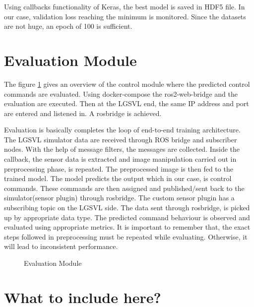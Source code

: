 Using callbacks functionality of Keras, the best model is saved in HDF5 file. In our case, validation
loss  reaching the minimum is monitored. Since the datasets are not huge, an epoch of 100
is sufficient.
\fi
\section{Evaluation Module}
The figure \ref{fig:evaluationfigure} gives an overview of the control module where the
predicted control commands are evaluated.
Using docker-compose the ros2-web-bridge and the evaluation are executed. Then at the
LGSVL end, the same IP address and port are entered and listened in. A rosbridge is
achieved.

Evaluation is basically completes the loop of end-to-end training architecture.  The LGSVL simulator data are received through ROS
bridge and subscriber nodes. With the help of message filters, the messages are collected.
Inside the callback, the sensor data is extracted and image manipulation carried out in preprocessing phase, is
repeated. The preprocessed image is then fed to the trained model. The model predicts the
output which in our case, is control commands. These commands are then assigned and published/sent
back to the simulator(sensor plugin) through rosbridge. The custom sensor plugin has a subscribing topic on the
LGSVL side. The data sent through rosbridge, is picked up by appropriate data type. The predicted command behaviour is observed and
evaluated using appropriate metrics. It is important to remember that, the exact steps followed
in preprocessing must be repeated while evaluating. Otherwise, it will lead to inconsistent
performance.

\begin{figure}
	\centering
    \def\svgwidth{1\textwidth}
    \caption{Evaluation Module}
    \label{fig:evaluationfigure}
\end{figure}

\iffalse
\section{What to include here?}

